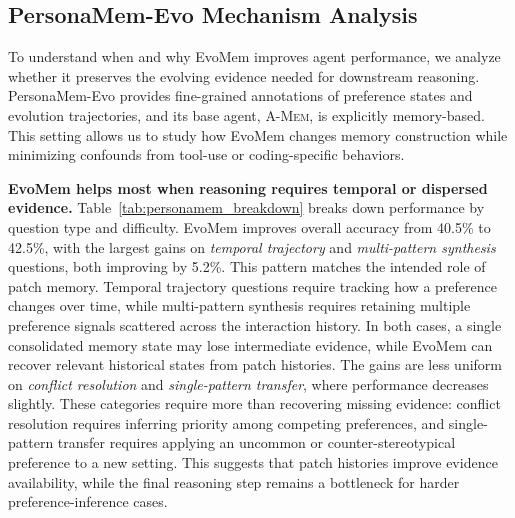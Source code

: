 \documentclass{llmxive}
\begin{document}
\subsection{PersonaMem-Evo Mechanism Analysis}

To understand when and why EvoMem improves agent performance, we analyze whether it preserves the evolving evidence needed for downstream reasoning. PersonaMem-Evo provides fine-grained annotations of preference states and evolution trajectories, and its base agent, \textsc{A-Mem}, is explicitly memory-based. 
This setting allows us to study how EvoMem changes memory construction while minimizing confounds from tool-use or coding-specific behaviors. 




\textbf{EvoMem helps most when reasoning requires temporal or dispersed evidence.} \quad
Table~\ref{tab:personamem_breakdown} breaks down performance by question type and difficulty. EvoMem improves overall accuracy from 40.5\% to 42.5\%, with the largest gains on \emph{temporal trajectory} and \emph{multi-pattern synthesis} questions, both improving by 5.2\%. This pattern matches the intended role of patch memory. Temporal trajectory questions require tracking how a preference changes over time, while multi-pattern synthesis requires retaining multiple preference signals scattered across the interaction history. In both cases, a single consolidated memory state may lose intermediate evidence, while EvoMem can recover relevant historical states from patch histories. The gains are less uniform on \emph{conflict resolution} and \emph{single-pattern transfer}, where performance decreases slightly. These categories require more than recovering missing evidence: conflict resolution requires inferring priority among competing preferences, and single-pattern transfer requires applying an uncommon or counter-stereotypical preference to a new setting. This suggests that patch histories improve evidence availability, while the final reasoning step remains a bottleneck for harder preference-inference cases.
\end{document}
